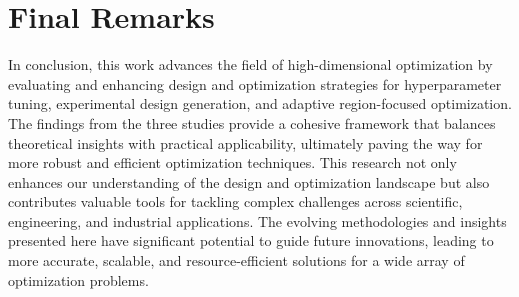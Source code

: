 \section{Final Remarks}

In conclusion, this work advances the field of high-dimensional optimization by evaluating and enhancing design and optimization strategies for hyperparameter tuning, experimental design generation, and adaptive region-focused optimization. The findings from the three studies provide a cohesive framework that balances theoretical insights with practical applicability, ultimately paving the way for more robust and efficient optimization techniques. This research not only enhances our understanding of the design and optimization landscape but also contributes valuable tools for tackling complex challenges across scientific, engineering, and industrial applications. The evolving methodologies and insights presented here have significant potential to guide future innovations, leading to more accurate, scalable, and resource-efficient solutions for a wide array of optimization problems.

\pagebreak